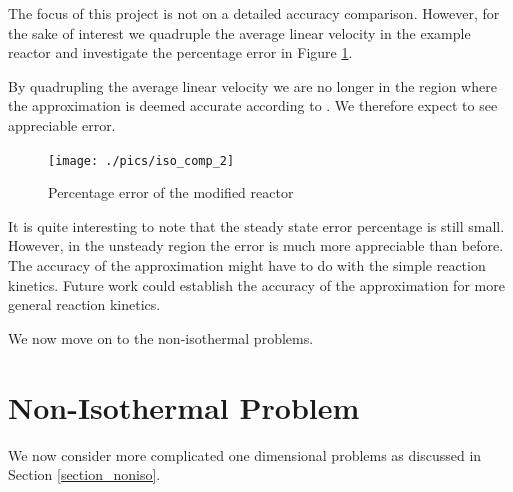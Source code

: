 \documentclass[11pt,fleqn]{article}
\theoremstyle{defstyle}
\begin{document}
The focus of this project is not on a detailed accuracy comparison. However, for the sake of interest we quadruple the average linear velocity in the example reactor and investigate the percentage error in Figure \ref{fig_isocomp2}.

By quadrupling the average linear velocity we are no longer in the region where the approximation is deemed accurate according to \cite{washington}. We therefore expect to see appreciable error. 
\begin{figure}[H] 
\centering
\texttt{[image: ./pics/iso\_comp\_2]}
\caption{Percentage error of the modified reactor} 
\label{fig_isocomp2}
\end{figure}
It is quite interesting to note that the steady state error percentage is still small. However, in the unsteady region the error is much more appreciable than before. The accuracy of the approximation might have to do with the simple reaction kinetics. Future work could establish the accuracy of the approximation for more general reaction kinetics.

We now move on to the non-isothermal problems.

\section{Non-Isothermal Problem}

We now consider more complicated one dimensional problems as discussed in Section \ref{section_noniso}.
\end{document}
